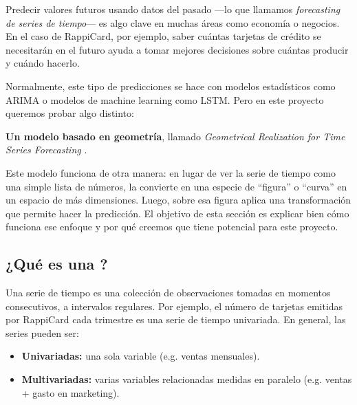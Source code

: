 Predecir valores futuros usando datos del pasado —lo que llamamos \textit{forecasting de series de tiempo}— es algo clave en muchas áreas como economía o negocios. En el caso de RappiCard, por ejemplo, saber cuántas tarjetas de crédito se necesitarán en el futuro ayuda a tomar mejores decisiones sobre cuántas producir y cuándo hacerlo.

Normalmente, este tipo de predicciones se hace con modelos estadísticos como ARIMA o modelos de machine learning como LSTM. Pero en este proyecto queremos probar algo distinto:

\textbf{Un modelo basado en geometría}, llamado \textit{Geometrical Realization for Time Series Forecasting} \cite{bayeh2024gr}.

Este modelo funciona de otra manera: en lugar de ver la serie de tiempo como una simple lista de números, la convierte en una especie de “figura” o “curva” en un espacio de más dimensiones. Luego, sobre esa figura aplica una transformación que permite hacer la predicción. El objetivo de esta sección es explicar bien cómo funciona ese enfoque y por qué creemos que tiene potencial para este proyecto.

\subsection*{¿Qué es una ?}
Una serie de tiempo es una colección de observaciones tomadas en momentos consecutivos, a intervalos regulares. Por ejemplo, el número de tarjetas emitidas por RappiCard cada trimestre es una serie de tiempo univariada. En general, las series pueden ser:

\begin{itemize}
    \item \textbf{Univariadas:} una sola variable (e.g. ventas mensuales).
    \item \textbf{Multivariadas:} varias variables relacionadas medidas en paralelo (e.g. ventas + gasto en marketing).
\end{itemize}